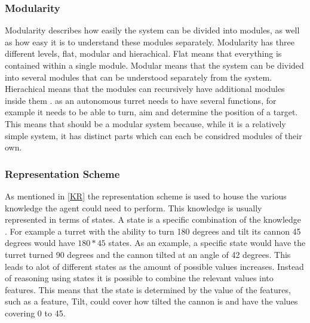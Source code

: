 \subsubsection{Modularity}
Modularity describes how easily the system can be divided into modules, as well
as how easy it is to understand these modules separately. Modularity has three
different levels, flat, modular and hierachical. Flat means that everything is
contained within a single module. Modular means that the system can be divided
into several modules that can be understood separately from the system.
Hierachical means that the modules can recursively have additional modules
inside them \citep[ch.1.5.1]{MIBook}. \name as an autonomous turret needs to
have several functions, for example it needs to be able to turn, aim and determine the position of a target.
This means that \name should be a modular system because, while it is a
relatively simple system, it has distinct parts which can each be considred
modules of their own.

\subsubsection{Representation Scheme}
As mentioned in \autoref{KR} the representation scheme is used to house the
various knowledge the agent could need to perform. This knowledge is usually
represented in terms of states. A state is a specific combination of
the knowledge \citep[ch.1.5.2]{MIBook}. For example a turret with the ability
to turn 180 degrees and tilt its cannon 45 degrees would have $180 * 45$ states. As an example, a
specific state would have the turret turned 90 degrees and the cannon tilted at an angle of 42
degrees. This leads to alot of different states as the amount of possible values
increases. Instead of reasoning using states it is possible to combine the
relevant values into features. This means that the state is determined by the
value of the features, such as a feature, Tilt, could cover how tilted the
cannon is and have the values covering 0 to 45.

